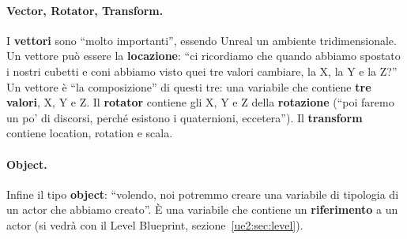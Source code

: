\paragraph{Vector, Rotator, Transform.} I \textbf{vettori} sono ``molto importanti'',
essendo Unreal un ambiente tridimensionale. Un vettore può essere la
\textbf{locazione}: ``ci ricordiamo che quando abbiamo spostato i nostri cubetti e coni
abbiamo visto quei tre valori cambiare, la X, la Y e la Z?'' Un vettore è ``la
composizione'' di questi tre: una variabile che contiene \textbf{tre valori}, X, Y e Z.
Il \textbf{rotator} contiene gli X, Y e Z della \textbf{rotazione} (``poi faremo un po'
di discorsi, perché esistono i quaternioni, eccetera''). Il \textbf{transform}
contiene location, rotation e scala.

\paragraph{Object.} Infine il tipo \textbf{object}: ``volendo, noi potremmo creare una
variabile di tipologia di un actor che abbiamo creato''. È una variabile che contiene un
\textbf{riferimento} a un actor (si vedrà con il Level Blueprint,
sezione~\ref{ue2:sec:level}).

